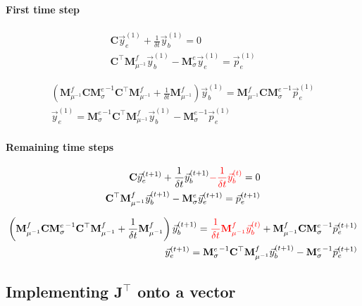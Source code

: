 \documentclass[]{article}
\newcommand{\dcurl}{{\mathbf C}}
\newcommand{\M}{{\mathbf M}}
\newcommand{\MfMui}{{\M^f_{\mu^{-1}}}}
\newcommand{\MeSig}{{\M^e_\sigma}}
\begin{document}
\paragraph{First time step}

\begin{subequations}
    \begin{align}
        \dcurl \vec{y}_{e}^{(1)} + \frac{1}{\delta t} \vec{y}_{b}^{(1)} = 0 \\
        \dcurl^\top \MfMui \vec{y}_b^{(1)} - \MeSig \vec{y}_e^{(1)} = \vec{p}_e^{(1)}
    \end{align}
\end{subequations}

\begin{subequations}
    \begin{align}
        \left( \MfMui \dcurl \MeSig^{-1} \dcurl^\top \MfMui + \frac{1}{\delta t} \MfMui \right) \vec{y}_{b}^{(1)} = \MfMui \dcurl \MeSig^{-1} \vec{p}_e^{(1)} \\
        \vec{y}_e^{(1)} = \MeSig^{-1} \dcurl^\top \MfMui \vec{y}_b^{(1)} - \MeSig^{-1} \vec{p}_e^{(1)}
    \end{align}
\end{subequations}

\paragraph{Remaining time steps}

\begin{subequations}
    \begin{align}
        \dcurl \vec{y}_{e}^{(t+1)} + \frac{1}{\delta t} \vec{y}_{b}^{(t+1)}
        {\color{red}- \frac{1}{\delta t} \vec{y}_{b}^{(t)} }
        = 0 \\
        \dcurl^\top \MfMui \vec{y}_b^{(t+1)} - \MeSig \vec{y}_e^{(t+1)} = \vec{p}_e^{(t+1)}
    \end{align}
\end{subequations}

\begin{subequations}
        \begin{align}
            \left( \MfMui \dcurl \MeSig^{-1} \dcurl^\top \MfMui + \frac{1}{\delta t} \MfMui \right) \vec{y}_{b}^{(t+1)} =
            {\color{red} \frac{1}{\delta t} \MfMui \vec{y}_b^{(t)} }
            + \MfMui \dcurl \MeSig^{-1} \vec{p}_e^{(t+1)} \\
            \vec{y}_e^{(t+1)} = \MeSig^{-1} \dcurl^\top \MfMui \vec{y}_b^{(t+1)} - \MeSig^{-1} \vec{p}_e^{(t+1)}
        \end{align}
    \end{subequations}

\subsection{Implementing $\mathbf{J}^\top$ onto a vector}
\end{document}
